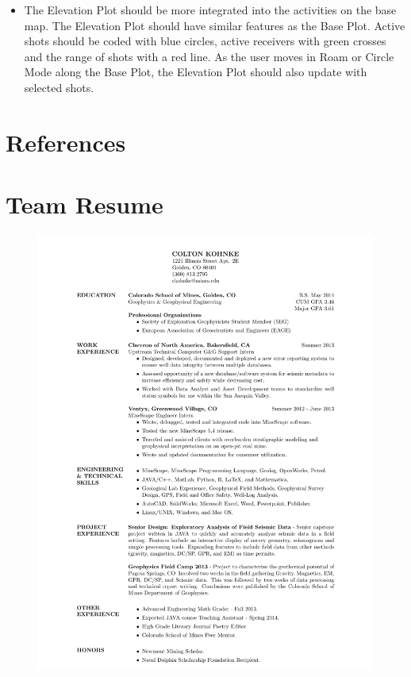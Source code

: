 \documentclass[12pt]{article}
\begin{document}
\begin{itemize}
\item The Elevation Plot should be more integrated into the activities on the base map. The Elevation Plot should have similar features as the Base Plot. Active shots should be coded with blue circles, active receivers with green crosses and the range of shots with a red line. As the user moves in Roam or Circle Mode along the Base Plot, the Elevation Plot should also update with selected shots.
\end{itemize}

\newpage
\section{References}

\printbibliography

\newpage
\section{Team Resume}

\begin{figure}[H]
\includegraphics[scale=0.80]{./Resume_of_Colton_Kohnke.pdf}
\end{figure}
\end{document}
